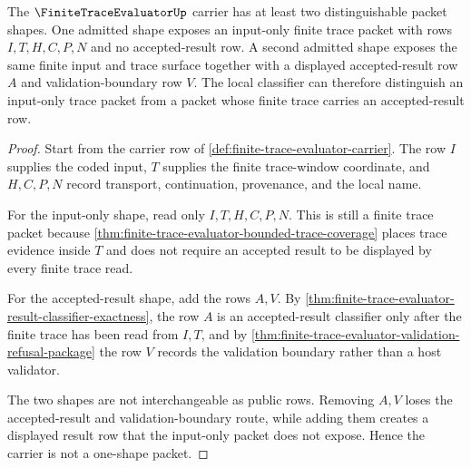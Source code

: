 \begin{theorem}
\label{thm:finite-trace-evaluator-nontrivial-carrier-pair}
The $\FiniteTraceEvaluatorUp$ carrier has at least two distinguishable packet
shapes. One admitted shape exposes an input-only finite trace packet with rows
$I,T,H,C,P,N$ and no accepted-result row. A second admitted shape exposes the
same finite input and trace surface together with a displayed accepted-result
row $A$ and validation-boundary row $V$. The local classifier can therefore
distinguish an input-only trace packet from a packet whose finite trace carries
an accepted-result row.
\end{theorem}
\begin{proof}
Start from the carrier row of \autoref{def:finite-trace-evaluator-carrier}.
The row $I$ supplies the coded input, $T$ supplies the finite trace-window
coordinate, and $H,C,P,N$ record transport, continuation, provenance, and the
local name.

For the input-only shape, read only $I,T,H,C,P,N$. This is still a finite trace
packet because \autoref{thm:finite-trace-evaluator-bounded-trace-coverage}
places trace evidence inside $T$ and does not require an accepted result to be
displayed by every finite trace read.

For the accepted-result shape, add the rows $A,V$. By
\autoref{thm:finite-trace-evaluator-result-classifier-exactness}, the row $A$
is an accepted-result classifier only after the finite trace has been read from
$I,T$, and by \autoref{thm:finite-trace-evaluator-validation-refusal-package}
the row $V$ records the validation boundary rather than a host validator.

The two shapes are not interchangeable as public rows. Removing $A,V$ loses
the accepted-result and validation-boundary route, while adding them creates a
displayed result row that the input-only packet does not expose. Hence the
carrier is not a one-shape packet.
\end{proof}


